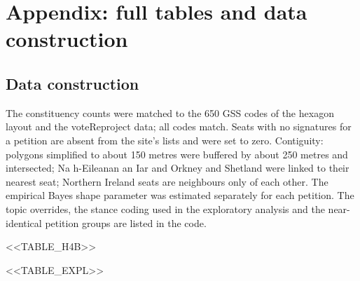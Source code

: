 \documentclass[11pt,a4paper]{article}
\begin{document}
\clearpage
\appendix
\section{Appendix: full tables and data construction}
\subsection{Data construction}
The constituency counts were matched to the 650 GSS codes of the hexagon layout and the voteReproject data; all codes match. Seats with no signatures for a petition are absent from the site's lists and were set to zero. Contiguity: polygons simplified to about 150 metres were buffered by about 250 metres and intersected; Na h-Eileanan an Iar and Orkney and Shetland were linked to their nearest seat; Northern Ireland seats are neighbours only of each other. The empirical Bayes shape parameter was estimated separately for each petition. The topic overrides, the stance coding used in the exploratory analysis and the near-identical petition groups are listed in the code.

<<TABLE_H4B>>

<<TABLE_EXPL>>
\end{document}
